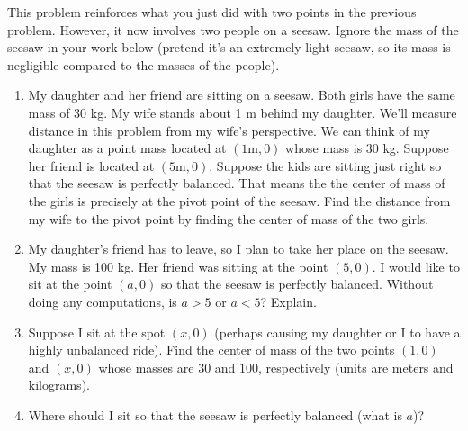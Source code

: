 \begin{problem}
 This problem reinforces what you just did with two points in the previous problem. However, it now involves two people on a seesaw. %
Ignore the mass of the seesaw in your work below (pretend it's an extremely light seesaw, so its mass is negligible compared to the masses of the people).
\begin{enumerate}
 \item 
 My daughter and her friend are sitting on a seesaw.  Both girls have the same mass of 30 kg. My wife stands about 1 m behind my daughter. We'll measure distance in this problem from my wife's perspective.  We can think of my daughter as a point mass located at $(1\text{m},0)$ whose mass is $30$ kg. Suppose her friend is located at $(5\text{m},0)$. Suppose the kids are sitting just right so that the seesaw is perfectly balanced.  That means the the center of mass of the girls is precisely at the pivot point of the seesaw. Find the distance from my wife to the pivot point by finding the center of mass of the two girls. 
 \item My daughter's friend has to leave, so I plan to take her place on the seesaw. My mass is 100 kg. Her friend was sitting at the point $(5,0)$. I would like to sit at the point $(a,0)$ so that the seesaw is perfectly balanced. Without doing any computations, is $a>5$ or $a<5$? Explain.
 \item Suppose I sit at the spot $(x,0)$ (perhaps causing my daughter or I to have a highly unbalanced ride). Find the center of mass of the two points $(1,0)$ and $(x,0)$ whose masses are $30$ and $100$, respectively (units are meters and kilograms). 
 \item Where should I sit so that the seesaw is perfectly balanced (what is $a$)?
\end{enumerate}
\end{problem}

